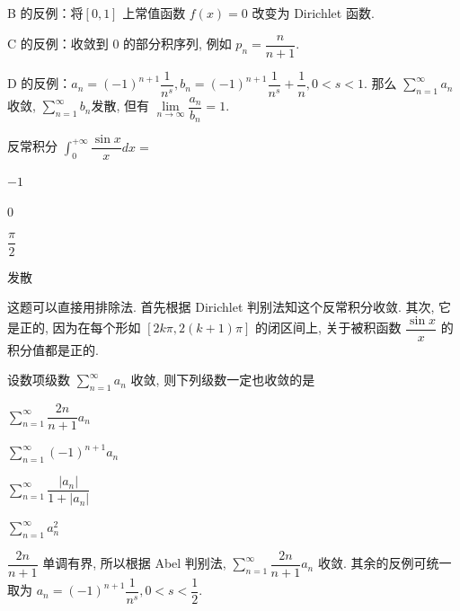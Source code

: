 \begin{solution}
B 的反例：将$[0, 1]$ 上常值函数 $f(x) = 0$ 改变为 Dirichlet 函数.

C 的反例：收敛到 $0$ 的部分积序列, 例如 $p_n = \dfrac{n}{n+1}.$

D 的反例：$a_n = (-1)^{n+1} \dfrac{1}{n^s}, b_n = (-1)^{n+1} \dfrac{1}{n^s} + \dfrac{1}{n}, 0 < s < 1.$ 那么 $\sum\limits_{n=1}^{\infty} a_n$ 收敛, $\sum\limits_{n=1}^{\infty} b_n$发散, 但有 $\lim\limits_{n\to\infty} \dfrac{a_n}{b_n} = 1.$
\end{solution}

\begin{question}
反常积分 $\int_0^{+\infty} \dfrac{\sin x}{x} dx =$ \paren[C]

\begin{choices}
\item $-1$
\item $0$
\item $\dfrac{\pi}{2}$
\item 发散
\end{choices}
\end{question}

\begin{solution}
这题可以直接用排除法. 首先根据 Dirichlet 判别法知这个反常积分收敛. 其次, 它是正的, 因为在每个形如 $[2k\pi, 2(k+1)\pi]$ 的闭区间上, 关于被积函数 $\dfrac{\sin x}{x}$ 的积分值都是正的.
\end{solution}

\begin{question}
设数项级数 $\sum\limits_{n=1}^{\infty} a_n$ 收敛, 则下列级数一定也收敛的是 \paren[A]

\begin{choices}
\item $\sum\limits_{n=1}^{\infty} \dfrac{2n}{n + 1} a_n$
\item $\sum\limits_{n=1}^{\infty} (-1)^{n+1} a_n$
\item $\sum\limits_{n=1}^{\infty} \dfrac{\lvert a_n \rvert}{1 + \lvert a_n \rvert}$
\item $\sum\limits_{n=1}^{\infty} a_n^2$
\end{choices}
\end{question}

\begin{solution}
$\dfrac{2n}{n + 1}$ 单调有界, 所以根据 Abel 判别法, $\sum\limits_{n=1}^{\infty} \dfrac{2n}{n + 1} a_n$ 收敛. 其余的反例可统一取为 $a_n = (-1)^{n+1} \dfrac{1}{n^s}, 0 < s < \dfrac{1}{2}.$
\end{solution}

